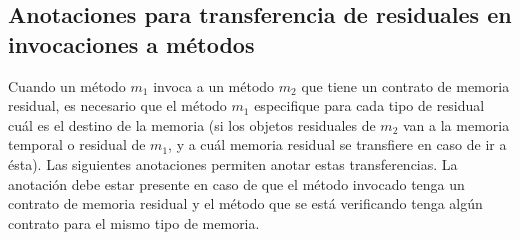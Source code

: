 \documentclass[12pt,a4paper]{article}
\begin{document}
		\subsection{Anotaciones para transferencia de residuales en invocaciones a métodos}
			Cuando un método $m_1$ invoca a un método $m_2$ que tiene un contrato de memoria residual, es necesario que el método $m_1$ especifique para cada tipo de residual cuál es el destino de la memoria (si los objetos residuales de $m_2$ van a la memoria temporal o residual de $m_1$, y a cuál memoria residual se transfiere en caso de ir a ésta). Las siguientes anotaciones permiten anotar estas transferencias. La anotación debe estar presente en caso de que el método invocado tenga un contrato de memoria residual y el método que se está verificando tenga algún contrato para el mismo tipo de memoria.
\end{document}
